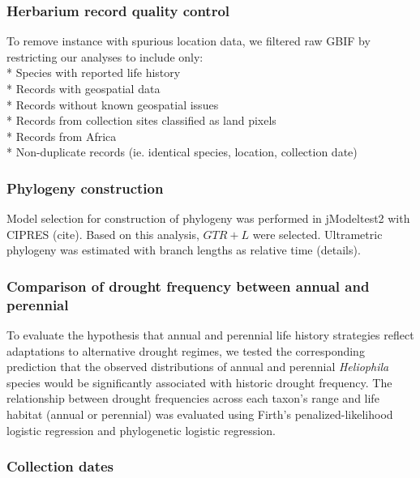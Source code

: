 \documentclass[man,floatsintext]{apa6}
\theoremstyle{definition}
\theoremstyle{definition}
\theoremstyle{definition}
\theoremstyle{remark}
\begin{document}
\hypertarget{herbarium-record-quality-control}{%
\subsubsection{Herbarium record quality
control}\label{herbarium-record-quality-control}}

To remove instance with spurious location data, we filtered raw GBIF by
restricting our analyses to include only:\\
* Species with reported life history\\
* Records with geospatial data\\
* Records without known geospatial issues\\
* Records from collection sites classified as land pixels\\
* Records from Africa\\
* Non-duplicate records (ie. identical species, location, collection
date)

\hypertarget{phylogeny-construction}{%
\subsubsection{Phylogeny construction}\label{phylogeny-construction}}

Model selection for construction of phylogeny was performed in
jModeltest2 with CIPRES (cite). Based on this analysis, \(GTR + L\) were
selected. Ultrametric phylogeny was estimated with branch lengths as
relative time (details).

\hypertarget{comparison-of-drought-frequency-between-annual-and-perennial}{%
\subsubsection{Comparison of drought frequency between annual and
perennial}\label{comparison-of-drought-frequency-between-annual-and-perennial}}

To evaluate the hypothesis that annual and perennial life history
strategies reflect adaptations to alternative drought regimes, we tested
the corresponding prediction that the observed distributions of annual
and perennial \emph{Heliophila} species would be significantly
associated with historic drought frequency. The relationship between
drought frequencies across each taxon's range and life habitat (annual
or perennial) was evaluated using Firth's penalized-likelihood logistic
regression and phylogenetic logistic regression.

\hypertarget{collection-dates}{%
\subsubsection{Collection dates}\label{collection-dates}}
\end{document}
